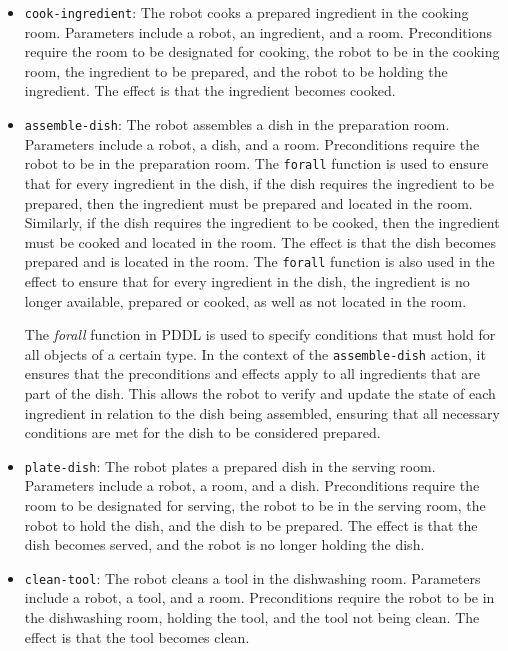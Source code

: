 \documentclass[a4paper,12pt]{article}
\begin{document}
\begin{itemize}
    \item \texttt{cook-ingredient}: The robot cooks a prepared ingredient in the cooking room. Parameters include a robot, an ingredient, and a room. Preconditions require the room to be designated for cooking, the robot to be in the cooking room, the ingredient to be prepared, and the robot to be holding the ingredient. The effect is that the ingredient becomes cooked.

    \item \texttt{assemble-dish}: The robot assembles a dish in the preparation room. Parameters include a robot, a dish, and a room. Preconditions require the robot to be in the preparation room. The \texttt{forall} function is used to ensure that for every ingredient in the dish, if the dish requires the ingredient to be prepared, then the ingredient must be prepared and located in the room. Similarly, if the dish requires the ingredient to be cooked, then the ingredient must be cooked and located in the room. The effect is that the dish becomes prepared and is located in the room. The \texttt{forall} function is also used in the effect to ensure that for every ingredient in the dish, the ingredient is no longer available, prepared or cooked, as well as not located in the room.

     The \textit{forall} function in PDDL is used to specify conditions that must hold for all objects of a certain type. In the context of the \texttt{assemble-dish} action, it ensures that the preconditions and effects apply to all ingredients that are part of the dish. This allows the robot to verify and update the state of each ingredient in relation to the dish being assembled, ensuring that all necessary conditions are met for the dish to be considered prepared.

    \item \texttt{plate-dish}: The robot plates a prepared dish in the serving room. Parameters include a robot, a room, and a dish. Preconditions require the room to be designated for serving, the robot to be in the serving room, the robot to hold the dish, and the dish to be prepared. The effect is that the dish becomes served, and the robot is no longer holding the dish.
    
    
    \item \texttt{clean-tool}: The robot cleans a tool in the dishwashing room. Parameters include a robot, a tool, and a room. Preconditions require the robot to be in the dishwashing room, holding the tool, and the tool not being clean. The effect is that the tool becomes clean.

\end{itemize}
\end{document}

